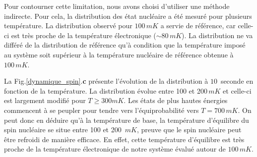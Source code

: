 Pour contourner cette limitation, nous avons choisi d'utiliser une méthode indirecte. Pour cela, la distribution des état nucléaire a été mesuré pour plusieurs température. La distribution observé pour $100\,mK$ a servie de référence, car celle-ci est très proche de la température électronique ($\sim 80\,mK$). La distribution ne va différé de la distribution de référence qu'à condition que la température imposé au système soit supérieur à la température nucléaire de référence obtenue à $100\,mK$.

La Fig.\ref{dynamique_spin}.\textbf{c} présente l'évolution de la distribution à $10\,$ seconde en fonction de la température. La distribution évolue entre 100 et 200$\,mK$ et celle-ci est largement modifié pour $T\geq 300mK$. Les états de plus hautes énergies commencent à se peupler pour tendre vers l'équiprobabilité vers $T=700\,mK$. On peut donc en déduire qu'à la température de base, la température d'équilibre du spin nucléaire se situe entre 100 et 200 $\,mK$, preuve que le spin nucléaire peut être refroidi de manière efficace. En effet, cette température d'équilibre est très proche de la température électronique de notre système évalué autour de $100\,mK$.